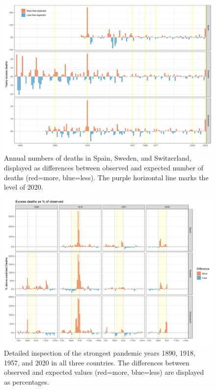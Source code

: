 \documentclass{article}
\begin{document}
	\begin{figure}[H]
		\centering	
		\includegraphics[width=\linewidth]{../Figure_S1.png}
		\caption{Annual numbers of deaths in Spain, Sweden, and Switzerland, displayed as differences between observed and expected number of deaths (red=more, blue=less). The purple horizontal line marks the level of 2020.}
	\end{figure}

	
	\begin{figure}[H]
		\centering	
		\includegraphics[width=\linewidth]{../Figure_S2.png}
		\caption{Detailed inspection of the strongest pandemic years 1890, 1918, 1957, and 2020 in all three countries. The differences between observed and expected values (red=more, blue=less) are displayed as percentages.}
	\end{figure}
\end{document}
